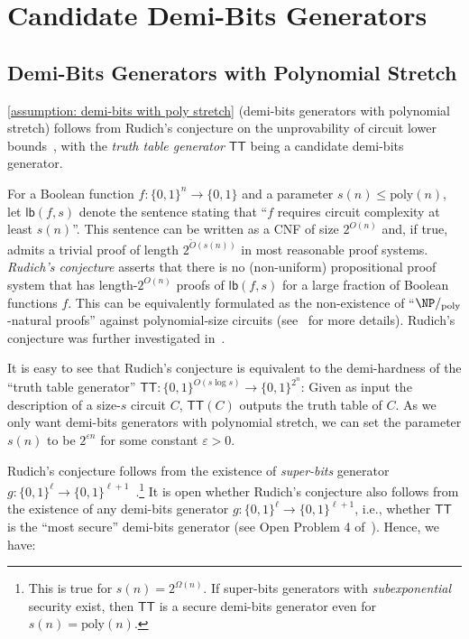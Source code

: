 \documentclass[10pt,a4paper]{article}
\theoremstyle{definition}
\theoremstyle{remark}
\renewcommand{\poly}{\mathrm{poly}}
\newcommand{\eps}{\varepsilon}
\newcommand{\TT}{\mathsf{TT}}
\begin{document}
\section{Candidate Demi-Bits Generators}\label{sec: candidate demi-bits}

\subsection{Demi-Bits Generators with Polynomial Stretch}
\autoref{assumption: demi-bits with poly stretch} (demi-bits generators with polynomial stretch) follows from Rudich's conjecture on the unprovability of circuit lower bounds~\cite{Rudich97}, with the \emph{truth table generator} $\TT$ being a candidate demi-bits generator.

\def\lb{\mathsf{lb}}
For a Boolean function $f: \{0, 1\}^n \to \{0, 1\}$ and a parameter $s(n) \le \poly(n)$, let $\lb(f, s)$ denote the sentence stating that ``$f$ requires circuit complexity at least $s(n)$''. This sentence can be written as a CNF of size $2^{O(n)}$ and, if true, admits a trivial proof of length $2^{\tilde{O}(s(n))}$ in most reasonable proof systems. \emph{Rudich's conjecture} asserts that there is no (non-uniform) propositional proof system that has length-$2^{O(n)}$ proofs of $\lb(f, s)$ for a large fraction of Boolean functions $f$. This can be equivalently formulated as the non-existence of ``$\NP/_{\poly}$-natural proofs'' against polynomial-size circuits (see~\cite{Rudich97} for more details). Rudich's conjecture was further investigated in~\cite{PichS19, SanthanamT21}.

It is easy to see that Rudich's conjecture is equivalent to the demi-hardness of the ``truth table generator'' $\TT:\{0, 1\}^{O(s\log s)} \to \{0, 1\}^{2^n}$: Given as input the description of a size-$s$ circuit $C$, $\TT(C)$ outputs the truth table of $C$. As we only want demi-bits generators with polynomial stretch, we can set the parameter $s(n)$ to be $2^{\eps n}$ for some constant $\eps > 0$. %

Rudich's conjecture follows from the existence of \emph{super-bits} generator $g: \{0, 1\}^\ell \to \{0, 1\}^{\ell+1}$~\cite{Rudich97,DBLP:journals/jacm/GoldreichGM86}.\footnote{This is true for $s(n) = 2^{\Omega(n)}$. If super-bits generators with \emph{subexponential} security exist, then $\TT$ is a secure demi-bits generator even for $s(n) = \poly(n)$.} It is open whether Rudich's conjecture also follows from the existence of any demi-bits generator $g: \{0, 1\}^\ell \to \{0, 1\}^{\ell + 1}$, i.e., whether $\TT$ is the ``most secure'' demi-bits generator (see Open Problem 4 of~\cite{Rudich97}). Hence, we have:
\end{document}
